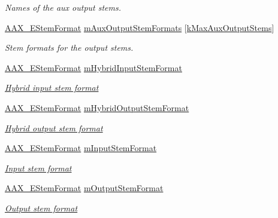\begin{DoxyCompactItemize}
\begin{DoxyCompactList}\small\item\em Names of the aux output stems. \end{DoxyCompactList}\item 
\hyperlink{a00206_ad8af5ef008b2bd478add9a0acb0a1d85}{A\+A\+X\+\_\+\+E\+Stem\+Format} \hyperlink{a00124_afd521b6b1d9b3d809e55c5c065859159}{m\+Aux\+Output\+Stem\+Formats} \mbox{[}\hyperlink{a00178_a3ce9db1fba97512379a8715f9cb166e4}{k\+Max\+Aux\+Output\+Stems}\mbox{]}
\begin{DoxyCompactList}\small\item\em Stem formats for the output stems. \end{DoxyCompactList}\item 
\hyperlink{a00206_ad8af5ef008b2bd478add9a0acb0a1d85}{A\+A\+X\+\_\+\+E\+Stem\+Format} \hyperlink{a00124_aeeee9ec016294caab1317d170ee0a2c2}{m\+Hybrid\+Input\+Stem\+Format}
\begin{DoxyCompactList}\small\item\em \hyperlink{a00335_ga6571f4e41a5dd06e4067249228e2249ea33a950bc2e02d38fc3be0a0ad8cc89b1}{Hybrid input stem format} \end{DoxyCompactList}\item 
\hyperlink{a00206_ad8af5ef008b2bd478add9a0acb0a1d85}{A\+A\+X\+\_\+\+E\+Stem\+Format} \hyperlink{a00124_a1cc911c56d96a35affcc8fea94a983ae}{m\+Hybrid\+Output\+Stem\+Format}
\begin{DoxyCompactList}\small\item\em \hyperlink{a00335_ga6571f4e41a5dd06e4067249228e2249eac30a4e73772e37267dfef39ae3122705}{Hybrid output stem format} \end{DoxyCompactList}\item 
\hyperlink{a00206_ad8af5ef008b2bd478add9a0acb0a1d85}{A\+A\+X\+\_\+\+E\+Stem\+Format} \hyperlink{a00124_aeb7ea647e496b742bc5bad5576f5ec1f}{m\+Input\+Stem\+Format}
\begin{DoxyCompactList}\small\item\em \hyperlink{a00283_a6571f4e41a5dd06e4067249228e2249eadebf03028b758123965a8b988fa2df99}{Input stem format} \end{DoxyCompactList}\item 
\hyperlink{a00206_ad8af5ef008b2bd478add9a0acb0a1d85}{A\+A\+X\+\_\+\+E\+Stem\+Format} \hyperlink{a00124_ac69ab2fe88b00dfb6f22d7e2ebfa134d}{m\+Output\+Stem\+Format}
\begin{DoxyCompactList}\small\item\em \hyperlink{a00283_a6571f4e41a5dd06e4067249228e2249ea211fdc6277e7fa652b5d482e810b0bc9}{Output stem format} \end{DoxyCompactList}\item 

\end{DoxyCompactItemize}
